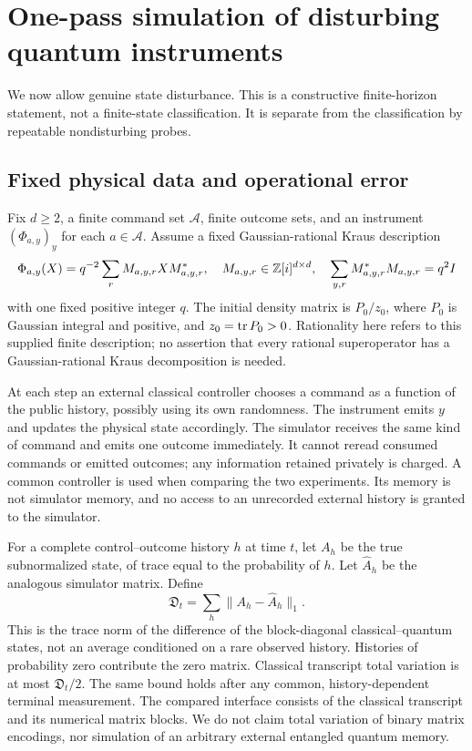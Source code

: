 \section{One-pass simulation of disturbing quantum instruments}
\label{sec:instruments65}
We now allow genuine state disturbance. This is a constructive
finite-horizon statement, not a finite-state classification. It is
separate from the classification by repeatable nondisturbing probes.

\subsection{Fixed physical data and operational error}
Fix $d\ge2$, a finite command set $\mathcal A$, finite outcome sets,
and an instrument $(\Phi_{a,y})_y$ for each $a\in\mathcal A$. Assume
a fixed Gaussian-rational Kraus description
\begin{equation}\label{eq:krausdata65}
 \Phi_{a,y}(X)=q^{-2}\sum_r M_{a,y,r}X M_{a,y,r}^*,\quad
 M_{a,y,r}\in\mathbb Z[i]^{d\times d},\quad
 \sum_{y,r}M_{a,y,r}^*M_{a,y,r}=q^2I
\end{equation}
with one fixed positive integer $q$. The initial density matrix is
$P_0/z_0$, where $P_0$ is Gaussian integral and positive, and
$z_0=\operatorname{tr} P_0>0$. Rationality here refers to this supplied finite
description; no assertion that every rational superoperator has a
Gaussian-rational Kraus decomposition is needed.

At each step an external classical controller chooses a command as
a function of the public history, possibly using its own randomness.
The instrument emits $y$ and updates the physical state accordingly.
The simulator receives the same kind of command and emits one outcome
immediately. It cannot reread consumed commands or emitted outcomes;
any information retained privately is charged. A common controller is
used when comparing the two experiments. Its memory is not simulator
memory, and no access to an unrecorded external history is granted to
the simulator.

For a complete control--outcome history $h$ at time $t$, let $A_h$
be the true subnormalized state, of trace equal to the probability
of $h$. Let $\widehat A_h$ be the analogous simulator matrix. Define
\begin{equation}\label{eq:cqerror65}
       \mathfrak D_t=\sum_h\|A_h-\widehat A_h\|_1.
\end{equation}
This is the trace norm of the difference of the block-diagonal
classical--quantum states, not an average conditioned on a rare
observed history. Histories of probability zero contribute the zero
matrix. Classical transcript total variation is at most
$\mathfrak D_t/2$. The same bound holds after any common,
history-dependent terminal measurement. The compared interface consists of the classical transcript
and its numerical matrix blocks. We do not claim total variation of
binary matrix encodings, nor simulation of an arbitrary external
entangled quantum memory.


